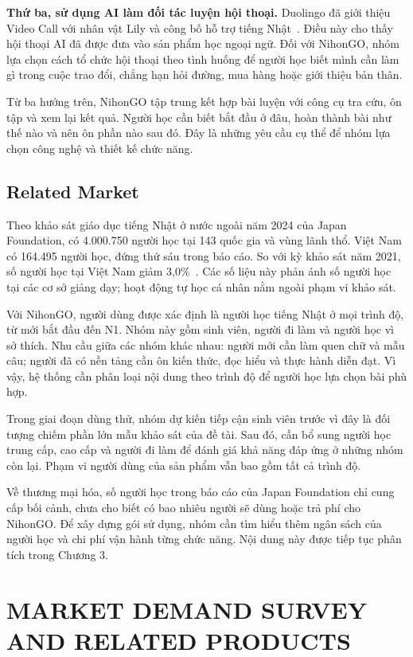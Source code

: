 \textbf{Thứ ba, sử dụng AI làm đối tác luyện hội thoại.} Duolingo đã giới thiệu Video Call với nhân vật Lily và công bố hỗ trợ tiếng Nhật~\cite{duolingo-videocall}. Điều này cho thấy hội thoại AI đã được đưa vào sản phẩm học ngoại ngữ. Đối với NihonGO, nhóm lựa chọn cách tổ chức hội thoại theo tình huống để người học biết mình cần làm gì trong cuộc trao đổi, chẳng hạn hỏi đường, mua hàng hoặc giới thiệu bản thân.

Từ ba hướng trên, NihonGO tập trung kết hợp bài luyện với công cụ tra cứu, ôn tập và xem lại kết quả. Người học cần biết bắt đầu ở đâu, hoàn thành bài như thế nào và nên ôn phần nào sau đó. Đây là những yêu cầu cụ thể để nhóm lựa chọn công nghệ và thiết kế chức năng.

\subsection{Related Market}

Theo khảo sát giáo dục tiếng Nhật ở nước ngoài năm 2024 của Japan Foundation, có 4.000.750 người học tại 143 quốc gia và vùng lãnh thổ. Việt Nam có 164.495 người học, đứng thứ sáu trong báo cáo. So với kỳ khảo sát năm 2021, số người học tại Việt Nam giảm 3,0\%~\cite{jpf2024}. Các số liệu này phản ánh số người học tại các cơ sở giảng dạy; hoạt động tự học cá nhân nằm ngoài phạm vi khảo sát.

Với NihonGO, người dùng được xác định là người học tiếng Nhật ở mọi trình độ, từ mới bắt đầu đến N1. Nhóm này gồm sinh viên, người đi làm và người học vì sở thích. Nhu cầu giữa các nhóm khác nhau: người mới cần làm quen chữ và mẫu câu; người đã có nền tảng cần ôn kiến thức, đọc hiểu và thực hành diễn đạt. Vì vậy, hệ thống cần phân loại nội dung theo trình độ để người học lựa chọn bài phù hợp.

Trong giai đoạn dùng thử, nhóm dự kiến tiếp cận sinh viên trước vì đây là đối tượng chiếm phần lớn mẫu khảo sát của đề tài. Sau đó, cần bổ sung người học trung cấp, cao cấp và người đi làm để đánh giá khả năng đáp ứng ở những nhóm còn lại. Phạm vi người dùng của sản phẩm vẫn bao gồm tất cả trình độ.

Về thương mại hóa, số người học trong báo cáo của Japan Foundation chỉ cung cấp bối cảnh, chưa cho biết có bao nhiêu người sẽ dùng hoặc trả phí cho NihonGO. Để xây dựng gói sử dụng, nhóm cần tìm hiểu thêm ngân sách của người học và chi phí vận hành từng chức năng. Nội dung này được tiếp tục phân tích trong Chương 3.

\section{MARKET DEMAND SURVEY AND RELATED PRODUCTS}

